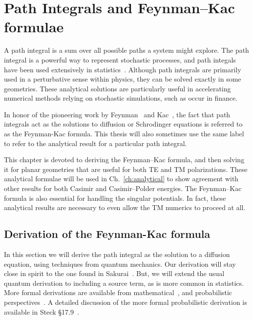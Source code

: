 \chapter{Path Integrals and Feynman--Kac formulae}

\label{ch:feynman_kac}

A path integral is a sum over all possible paths a system might explore.
The path integral is a powerful way to represent stochastic processes, and path integals have been used
extensively in statistics~\cite{Karatszas1991, Durrett1996,DelMoral2004}.  
Although path integrals are primarily used in a perturbative sense within physics, 
they can be solved exactly in some geometries.
These analytical solutions are particularly useful in accelerating numerical methods relying 
on stochastic simulations, such as occur in finance.  

In honor of the pioneering work by Feynman~\cite{Feynman1950} and Kac~\cite{Kac1950}, the fact that path integrals
act as the solutions to diffusion or Schrodinger equations is referred to as the Feynman-Kac 
formula.  This thesis will also sometimes use the same label to refer to the analytical
result for a particular path integral.  

This chapter is devoted to deriving the Feynman--Kac formula, and then solving
it for planar geometries that are useful for both TE and TM polarizations.
These analytical formulae will be used in Ch.~\ref{ch:analytical} to show agreement 
with other results for both Casimir and Casimir--Polder energies.
The Feynman--Kac formula is also essential for handling the singular potentials.  
In fact, these analytical results are necessary to even allow the TM numerics to proceed at all.

\section{Derivation of the Feynman-Kac formula }

In this section we will derive the path integral as the solution to a diffusion equation,
using techniques from quantum mechanics.
Our derivation will stay close in spirit to the  one found in Sakurai~\cite{Sakurai1994}.
But, we will extend the usual quantum derivation to including a source term, as is more common in statistics.
More formal derivations are available from mathematical~\cite{Cartier2004},
and probabilistic perspectives~\cite{Karatzas1991, Durrett1996}.  
A detailed discussion of the more formal probabilistic derivation is available in Steck \S 17.9~\cite{SteckNotes}.


